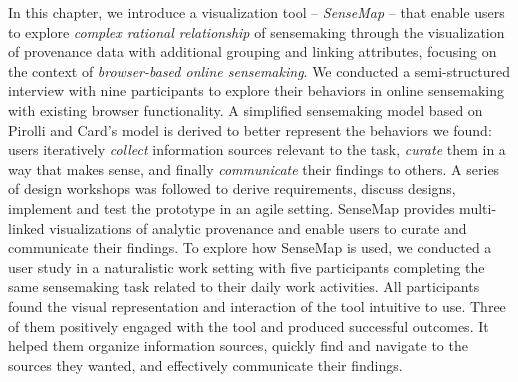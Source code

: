 In this chapter, we introduce a visualization tool -- \emph{SenseMap} -- that enable users to explore \emph{complex rational relationship} of sensemaking through the visualization of provenance data with additional grouping and linking attributes, focusing on the context of \emph{browser-based online sensemaking}. We conducted a semi-structured interview with nine participants to explore their behaviors in online sensemaking with existing browser functionality. A simplified sensemaking model based on Pirolli and Card's model is derived to better represent the behaviors we found: users iteratively \emph{collect} information sources relevant to the task, \emph{curate} them in a way that makes sense, and finally \emph{communicate} their findings to others. A series of design workshops was followed to derive requirements, discuss designs, implement and test the prototype in an agile setting. SenseMap provides multi-linked visualizations of analytic provenance and enable users to curate and communicate their findings. To explore how SenseMap is used, we conducted a user study in a naturalistic work setting with five participants completing the same sensemaking task related to their daily work activities. All participants found the visual representation and interaction of the tool intuitive to use. Three of them positively engaged with the tool and produced successful outcomes. It helped them organize information sources, quickly find and navigate to the sources they wanted, and effectively communicate their findings. 





